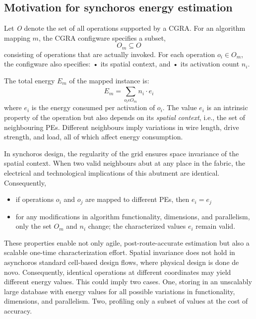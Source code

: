 \subsection{Motivation for synchoros energy estimation}
Let \textit{O} denote the set of all operations supported by a CGRA. 
For an algorithm mapping $m$, the CGRA configware specifies a subset, 
\[
O_{m} \subseteq O
\]
consisting of operations that are actually invoked. 
For each operation $o_i \in O_{m}$, the configware also specifies: • its spatial context, and • its activation count $n_i$.

The total energy $E_m$ of the mapped instance is:
\[
E_m = \sum_{o_{i}\epsilon O_m}^{} n_i \cdot e_i
\]
where $e_i$ is the energy consumed per activation of $o_i$.
The value $e_i$ is an intrinsic property of the operation but also depends on its \textit{spatial context}, i.e., the set of neighbouring PEs.
Different neighbours imply variations in wire length, drive strength, and load, all of which affect energy consumption.

In synchoros design, the regularity of the grid ensures space invariance of the spatial context. When two valid neighbours abut at any place in the fabric, the electrical and technological implications of this abutment are identical.
Consequently,
\begin{itemize}
    \item if operations \(o_i\) and \(o_j\) are mapped to different PEs, then \(e_i = e_j\)
    \item for any modifications in algorithm functionality, dimensions, and parallelism, only the set $O_m$ and $n_i$ change; the characterized values $e_i$ remain valid.
\end{itemize}

These properties enable not only agile, post-route-accurate estimation but also a scalable one-time characterization effort.
Spatial invariance does not hold in asynchoros standard cell-based design flows, where physical design is done de novo.
Consequently, identical operations at different coordinates may yield different energy values. 
This could imply two cases. One, storing in an unscalably
large database with energy values for all possible variations in
functionality, dimensions, and parallelism. Two, profiling only a subset of values at the cost of accuracy.

